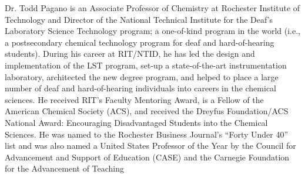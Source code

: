 \documentclass[11.5pt]{sig-alternate} %
\begin{document}
\begin{large}
Dr. Todd Pagano is an Associate Professor of Chemistry at Rochester Institute of Technology and Director of the National Technical Institute for the Deaf’s Laboratory Science Technology program; a one-of-kind program in the world (i.e., a postsecondary chemical technology program for deaf and hard-of-hearing students). During his career at RIT/NTID, he has led the design and implementation of the LST program, set-up a state-of-the-art instrumentation laboratory, architected the new degree program, and helped to place a large number of deaf and hard-of-hearing individuals into careers in the chemical sciences. He received RIT’s Faculty Mentoring Award, is a Fellow of the American Chemical Society (ACS), and received the Dreyfus Foundation/ACS National Award: Encouraging Disadvantaged Students into the Chemical Sciences. He was named to the Rochester Business Journal’s “Forty Under 40” list and was also named a United States Professor of the Year by the Council for Advancement and Support of Education (CASE) and the Carnegie Foundation for the Advancement of Teaching

\end{large}
\end{document}
